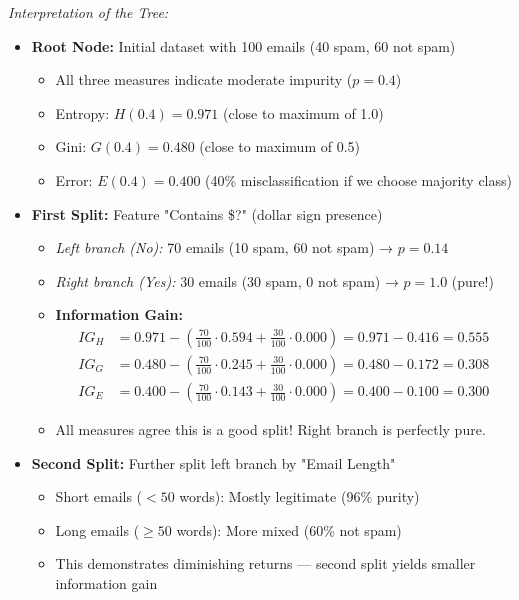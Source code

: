 \documentclass[12pt]{article}
\begin{document}
\begin{explanation}
\begin{center}
\begin{tikzpicture}
\end{tikzpicture}
\end{center}

\textit{Interpretation of the Tree:}

\begin{itemize}
    \item \textbf{Root Node:} Initial dataset with 100 emails (40 spam, 60 not spam)
    \begin{itemize}
        \item All three measures indicate moderate impurity ($p=0.4$)
        \item Entropy: $H(0.4) = 0.971$ (close to maximum of 1.0)
        \item Gini: $G(0.4) = 0.480$ (close to maximum of 0.5)
        \item Error: $E(0.4) = 0.400$ (40\% misclassification if we choose majority class)
    \end{itemize}

    \item \textbf{First Split:} Feature "Contains \$?" (dollar sign presence)
    \begin{itemize}
        \item \textit{Left branch (No):} 70 emails (10 spam, 60 not spam) → $p=0.14$
        \item \textit{Right branch (Yes):} 30 emails (30 spam, 0 not spam) → $p=1.0$ (pure!)
        \item \textbf{Information Gain:}
        \begin{align*}
        IG_H &= 0.971 - \left(\frac{70}{100} \cdot 0.594 + \frac{30}{100} \cdot 0.000\right) = 0.971 - 0.416 = 0.555 \\
        IG_G &= 0.480 - \left(\frac{70}{100} \cdot 0.245 + \frac{30}{100} \cdot 0.000\right) = 0.480 - 0.172 = 0.308 \\
        IG_E &= 0.400 - \left(\frac{70}{100} \cdot 0.143 + \frac{30}{100} \cdot 0.000\right) = 0.400 - 0.100 = 0.300
        \end{align*}
        \item All measures agree this is a good split! Right branch is perfectly pure.
    \end{itemize}

    \item \textbf{Second Split:} Further split left branch by "Email Length"
    \begin{itemize}
        \item Short emails ($< 50$ words): Mostly legitimate (96\% purity)
        \item Long emails ($\geq 50$ words): More mixed (60\% not spam)
        \item This demonstrates diminishing returns — second split yields smaller information gain
    \end{itemize}


\end{itemize}
\end{explanation}
\end{document}
